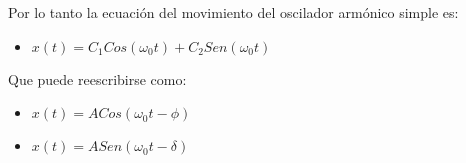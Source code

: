 
Por lo tanto la ecuación del movimiento del oscilador armónico simple es:

\begin{itemize}
    \item $x(t) = C_{1}Cos(\omega_{0}t) + C_{2}Sen(\omega_{0}t)$
\end{itemize}

Que puede reescribirse como:

\begin{itemize}
    \item $x(t) = ACos(\omega_{0}t - \phi)$
    \item $x(t) = ASen(\omega_{0}t - \delta)$
\end{itemize}